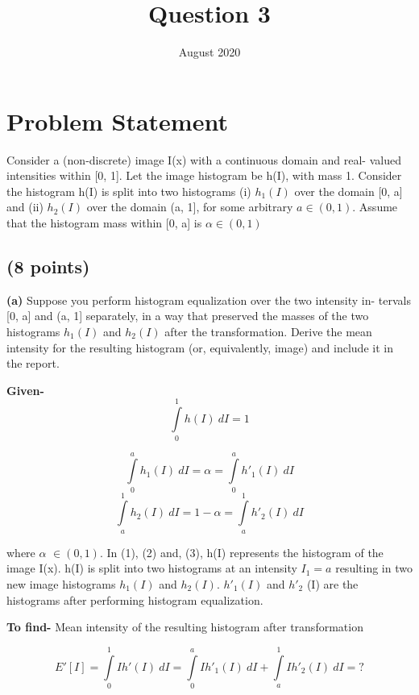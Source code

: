 \documentclass{article}
\title{Question 3}
\author{ }
\date{August 2020}
\begin{document}
\maketitle

\section{Problem Statement }

Consider a (non-discrete) image I(x) with a continuous domain and real-
valued intensities within [0, 1]. Let the image histogram be h(I), with mass
1. Consider the histogram h(I) is split into two histograms (i) $h_1 (I)$ over the
domain [0, a] and (ii) $h_2 (I)$ over the domain (a, 1], for some arbitrary $a \in (0,
1)$. Assume that the histogram mass within [0, a] is $\alpha \in (0, 1)$

\subsection{(8 points)}
\textbf{(a)} Suppose you perform histogram equalization over the two intensity in-
tervals [0, a] and (a, 1] separately, in a way that preserved the masses of the
two histograms $h_1 (I)$ and $h_2 (I)$ after the transformation. Derive the mean
intensity for the resulting histogram (or, equivalently, image) and include it
in the report.

\textbf{Given-}
\begin{equation}
\int\limits_0^1 h(I) \ dI =1 
\end{equation}
 
\begin{equation} \int\limits_0^a h_1(I) \ dI =\alpha = \int\limits_0^a h'_1(I) \ dI \end{equation} 
\begin{equation} \int\limits_a^1 h_2(I) \ dI =1-\alpha = \int\limits_a^1 h'_2(I) \ dI \end{equation} 

where $\alpha$ $ \in (0, 1)$. In (1), (2) and, (3), h(I) represents the histogram of the image I(x). h(I) is split into two histograms at an intensity $I_1 = a$ resulting in two new image histograms $h_1 (I)$ and $h_2 (I)$. $h'_1 (I)$ and $h'_2$  (I) are the histograms after performing histogram equalization.

\textbf{To find-} Mean intensity of the resulting histogram after transformation

\begin{equation}E'[I] =  \int\limits_0^1 I h'(I) \ dI = \int\limits_0^a I h'_1(I) \ dI + \int\limits_a^1 I h'_2(I) \ dI = ?\end{equation}
\end{document}
